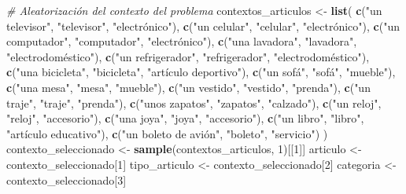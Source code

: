 \documentclass[
]{article}
\newenvironment{Shaded}{\begin{snugshade}}{\end{snugshade}}
\newcommand{\CommentTok}[1]{\textcolor[rgb]{0.56,0.35,0.01}{\textit{#1}}}
\newcommand{\DecValTok}[1]{\textcolor[rgb]{0.00,0.00,0.81}{#1}}
\newcommand{\FunctionTok}[1]{\textcolor[rgb]{0.13,0.29,0.53}{\textbf{#1}}}
\newcommand{\NormalTok}[1]{#1}
\newcommand{\OtherTok}[1]{\textcolor[rgb]{0.56,0.35,0.01}{#1}}
\newcommand{\StringTok}[1]{\textcolor[rgb]{0.31,0.60,0.02}{#1}}
\begin{document}
\begin{Shaded}
\begin{Highlighting}[]
\CommentTok{\# Aleatorización del contexto del problema}
\NormalTok{contextos\_articulos }\OtherTok{\textless{}{-}} \FunctionTok{list}\NormalTok{(}
  \FunctionTok{c}\NormalTok{(}\StringTok{"un televisor"}\NormalTok{, }\StringTok{"televisor"}\NormalTok{, }\StringTok{"electrónico"}\NormalTok{),}
  \FunctionTok{c}\NormalTok{(}\StringTok{"un celular"}\NormalTok{, }\StringTok{"celular"}\NormalTok{, }\StringTok{"electrónico"}\NormalTok{),}
  \FunctionTok{c}\NormalTok{(}\StringTok{"un computador"}\NormalTok{, }\StringTok{"computador"}\NormalTok{, }\StringTok{"electrónico"}\NormalTok{),}
  \FunctionTok{c}\NormalTok{(}\StringTok{"una lavadora"}\NormalTok{, }\StringTok{"lavadora"}\NormalTok{, }\StringTok{"electrodoméstico"}\NormalTok{),}
  \FunctionTok{c}\NormalTok{(}\StringTok{"un refrigerador"}\NormalTok{, }\StringTok{"refrigerador"}\NormalTok{, }\StringTok{"electrodoméstico"}\NormalTok{),}
  \FunctionTok{c}\NormalTok{(}\StringTok{"una bicicleta"}\NormalTok{, }\StringTok{"bicicleta"}\NormalTok{, }\StringTok{"artículo deportivo"}\NormalTok{),}
  \FunctionTok{c}\NormalTok{(}\StringTok{"un sofá"}\NormalTok{, }\StringTok{"sofá"}\NormalTok{, }\StringTok{"mueble"}\NormalTok{),}
  \FunctionTok{c}\NormalTok{(}\StringTok{"una mesa"}\NormalTok{, }\StringTok{"mesa"}\NormalTok{, }\StringTok{"mueble"}\NormalTok{),}
  \FunctionTok{c}\NormalTok{(}\StringTok{"un vestido"}\NormalTok{, }\StringTok{"vestido"}\NormalTok{, }\StringTok{"prenda"}\NormalTok{),}
  \FunctionTok{c}\NormalTok{(}\StringTok{"un traje"}\NormalTok{, }\StringTok{"traje"}\NormalTok{, }\StringTok{"prenda"}\NormalTok{),}
  \FunctionTok{c}\NormalTok{(}\StringTok{"unos zapatos"}\NormalTok{, }\StringTok{"zapatos"}\NormalTok{, }\StringTok{"calzado"}\NormalTok{),}
  \FunctionTok{c}\NormalTok{(}\StringTok{"un reloj"}\NormalTok{, }\StringTok{"reloj"}\NormalTok{, }\StringTok{"accesorio"}\NormalTok{),}
  \FunctionTok{c}\NormalTok{(}\StringTok{"una joya"}\NormalTok{, }\StringTok{"joya"}\NormalTok{, }\StringTok{"accesorio"}\NormalTok{),}
  \FunctionTok{c}\NormalTok{(}\StringTok{"un libro"}\NormalTok{, }\StringTok{"libro"}\NormalTok{, }\StringTok{"artículo educativo"}\NormalTok{),}
  \FunctionTok{c}\NormalTok{(}\StringTok{"un boleto de avión"}\NormalTok{, }\StringTok{"boleto"}\NormalTok{, }\StringTok{"servicio"}\NormalTok{)}
\NormalTok{)}
\NormalTok{contexto\_seleccionado }\OtherTok{\textless{}{-}} \FunctionTok{sample}\NormalTok{(contextos\_articulos, }\DecValTok{1}\NormalTok{)[[}\DecValTok{1}\NormalTok{]]}
\NormalTok{articulo }\OtherTok{\textless{}{-}}\NormalTok{ contexto\_seleccionado[}\DecValTok{1}\NormalTok{]}
\NormalTok{tipo\_articulo }\OtherTok{\textless{}{-}}\NormalTok{ contexto\_seleccionado[}\DecValTok{2}\NormalTok{]}
\NormalTok{categoria }\OtherTok{\textless{}{-}}\NormalTok{ contexto\_seleccionado[}\DecValTok{3}\NormalTok{]}


\end{Highlighting}
\end{Shaded}
\end{document}
